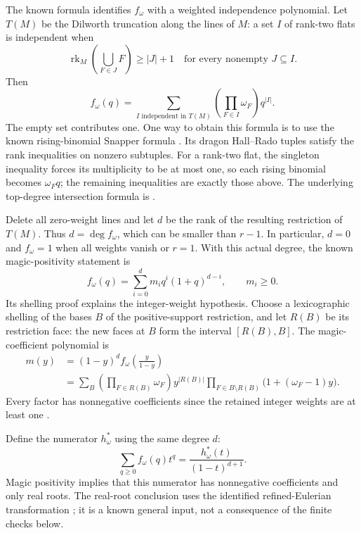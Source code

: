 The known formula identifies $f_\omega$ with a weighted
independence polynomial. Let $T(M)$ be the Dilworth truncation
along the lines of $M$: a set $I$ of rank-two flats is independent
when
\[
 \operatorname{rk}_M\!\left(\bigcup_{F\in J}F\right)
       \ge |J|+1
 \quad\text{for every nonempty }J\subseteq I.
\]
Then
\[
 f_\omega(q)=\sum_{I\text{ independent in }T(M)}
                     \left(\prod_{F\in I}\omega_F\right)q^{|I|}.
\]
The empty set contributes one. One way to obtain this formula
is to use the known rising-binomial Snapper formula
\cite[Corollary~7.5]{LLPP24KRings}. Its dragon Hall--Rado
tuples satisfy the rank inequalities on nonzero subtuples.
For a rank-two flat, the singleton inequality forces its
multiplicity to be at most one, so each rising binomial becomes
$\omega_Fq$; the remaining inequalities are exactly those above.
The underlying top-degree intersection formula is
\cite[Theorem~5.2.4]{BES24Simplicial}.

Delete all zero-weight lines and let $d$ be the rank of the
resulting restriction of $T(M)$. Thus $d=\deg f_\omega$, which
can be smaller than $r-1$. In particular, $d=0$ and
$f_\omega=1$ when all weights vanish or $r=1$. With this actual
degree, the known magic-positivity statement is
\[
 f_\omega(q)=\sum_{i=0}^d m_iq^i(1+q)^{d-i},
 \qquad m_i\ge0.
\]
Its shelling proof explains the integer-weight hypothesis.
Choose a lexicographic shelling of the bases $B$ of the
positive-support restriction, and let $R(B)$ be its
restriction face: the new faces at $B$ form the interval
$[R(B),B]$. The magic-coefficient polynomial is
\[
 \begin{split}
 m(y)&=(1-y)^d f_\omega\!\left(\frac{y}{1-y}\right)\\
 &=\sum_B
       \left(\prod_{F\in R(B)}\omega_F\right)y^{|R(B)|}
       \prod_{F\in B\setminus R(B)}
                    \bigl(1+(\omega_F-1)y\bigr).
 \end{split}
\]
Every factor has nonnegative coefficients since the retained
integer weights are at least one
\cite[proof of Theorem~3.7]{Li26Snapper}.

Define the numerator $h_\omega^*$ using the same degree $d$:
\[
 \sum_{q\ge0}f_\omega(q)t^q
       =\frac{h_\omega^*(t)}{(1-t)^{d+1}}.
\]
Magic positivity implies that this numerator has nonnegative
coefficients and only real roots. The real-root conclusion
uses the identified refined-Eulerian transformation
\cite[Corollary~4.5]{BJM19Zonotopes}; it is a known general
input, not a consequence of the finite checks below.

